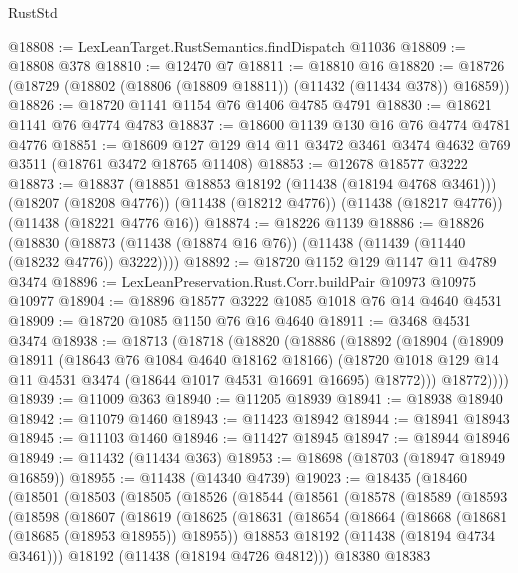 \begin{lexlean}{RustStd}
\begin{coremodule}
@18808 := LexLeanTarget.RustSemantics.findDispatch @11036
@18809 := @18808 @378
@18810 := @12470 @7
@18811 := @18810 @16
@18820 := @18726 (@18729 (@18802 (@18806 (@18809 @18811)) (@11432 (@11434 @378)) @16859))
@18826 := @18720 @1141 @1154 @76 @1406 @4785 @4791
@18830 := @18621 @1141 @76 @4774 @4783
@18837 := @18600 @1139 @130 @16 @76 @4774 @4781 @4776
@18851 := @18609 @127 @129 @14 @11 @3472 @3461 @3474 @4632 @769 @3511 (@18761 @3472 @18765 @11408)
@18853 := @12678 @18577 @3222
@18873 := @18837
    (@18851 @18853 @18192 (@11438 (@18194 @4768 @3461)))
    (@18207 (@18208 @4776))
    (@11438 (@18212 @4776))
    (@11438 (@18217 @4776))
    (@11438 (@18221 @4776 @16))
@18874 := @18226 @1139
@18886 := @18826
    (@18830 (@18873 (@11438 (@18874 @16 @76)) (@11438 (@11439 (@11440 (@18232 @4776)) @3222))))
@18892 := @18720 @1152 @129 @1147 @11 @4789 @3474
@18896 := LexLeanPreservation.Rust.Corr.buildPair @10973 @10975 @10977
@18904 := @18896 @18577 @3222 @1085 @1018 @76 @14 @4640 @4531
@18909 := @18720 @1085 @1150 @76 @16 @4640
@18911 := @3468 @4531 @3474
@18938 := @18713
    (@18718
      (@18820
        (@18886
          (@18892
            (@18904
              (@18909
                @18911
                (@18643 @76 @1084 @4640 @18162 @18166)
                (@18720 @1018 @129 @14 @11 @4531 @3474 (@18644 @1017 @4531 @16691 @16695) @18772)))
            @18772))))
@18939 := @11009 @363
@18940 := @11205 @18939
@18941 := @18938 @18940
@18942 := @11079 @1460
@18943 := @11423 @18942
@18944 := @18941 @18943
@18945 := @11103 @1460
@18946 := @11427 @18945
@18947 := @18944 @18946
@18949 := @11432 (@11434 @363)
@18953 := @18698 (@18703 (@18947 @18949 @16859))
@18955 := @11438 (@14340 @4739)
@19023 := @18435
    (@18460
      (@18501
        (@18503
          (@18505
            (@18526
              (@18544
                (@18561
                  (@18578
                    (@18589
                      (@18593
                        (@18598
                          (@18607
                            (@18619
                              (@18625
                                (@18631
                                  (@18654
                                    (@18664
                                      (@18668 (@18681 (@18685 (@18953 @18955)) @18955))
                                      @18853
                                      @18192
                                      (@11438 (@18194 @4734 @3461)))
                                    @18192
                                    (@11438 (@18194 @4726 @4812)))
                                  @18380
                                  @18383

\end{coremodule}
\end{lexlean}
